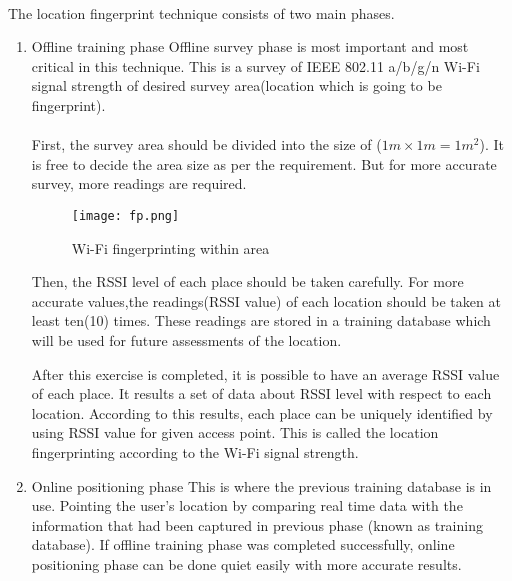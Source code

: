\paragraph{}
The location fingerprint technique consists of two main phases.
	\begin{enumerate}
		\item Offline training phase
		\subitem Offline survey phase is most important and most critical in this technique. This is a survey of IEEE 802.11 a/b/g/n Wi-Fi signal strength of desired survey area(location which is going to be fingerprint). 
		\paragraph{}
		First, the survey area should be divided into the size of ($1m\times1m = 1m^2$). It is free to decide the area size as per the requirement. But for more accurate survey, more readings are required.
			\begin{figure*}[h]	
				\centering
				\texttt{[image: fp.png]}
				\caption{Wi-Fi fingerprinting within area}
			\end{figure*}
		
		Then, the RSSI level of each place should be taken carefully. For more accurate values,the readings(RSSI value) of each location should be taken at least ten(10) times. These readings are stored in a training database which will be used for future assessments of the location.
		
		After this exercise is completed, it is possible to have an average RSSI value of each place. It results a set of data about RSSI level with respect to each location. According to this results, each place can be uniquely identified by using RSSI value for given access point. This is called the location fingerprinting according to the Wi-Fi signal strength.
		
		
		\item Online positioning phase
		\subitem This is where the previous training database is in use. Pointing the user's location by comparing real time data with the information that had been captured in previous phase (known as training database). If offline training phase was completed successfully, online positioning phase can be done quiet easily with more accurate results.
		

\end{enumerate}
